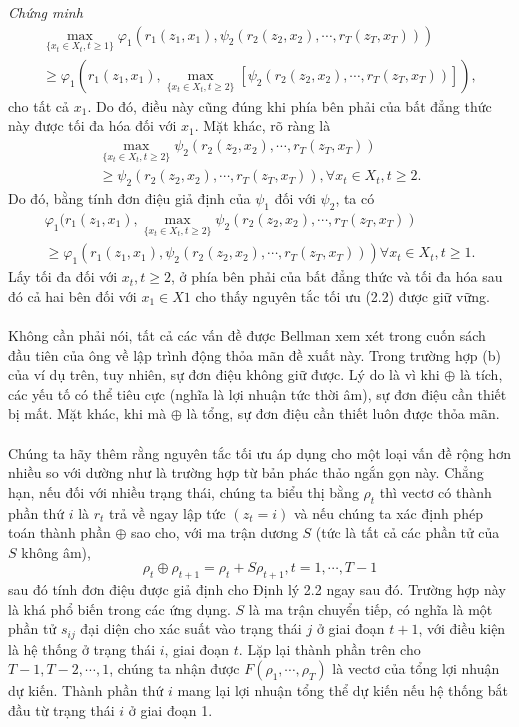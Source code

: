 \documentclass[12pt,a4paper]{report}
\begin{document}
		\textit{Chứng minh}
		\begin{eqnarray}
		\max_{\{x_t \in X_t, t \geq 1\}} \varphi_1(r_1(z_1, x_1), \psi_2(r_2(z_2,x_2),\cdots, r_T(z_T, x_T))) \nonumber \\  \geq \varphi_1(r_1(z_1, x_1), \max_{\{x_t \in X_t, t \geq 2\}}[\psi_2(r_2(z_2, x_2), \cdots, r_T(z_T, x_T))]), \nonumber
		\end{eqnarray}  
		cho tất cả $x_1$. Do đó, điều này cũng đúng khi phía bên phải của bất đẳng thức này được tối đa hóa đối với $x_1$. Mặt khác, rõ ràng là
			\begin{eqnarray}
		\max_{\{x_t \in X_t, t \geq 2\}}\psi_2(r_2(z_2,x_2),\cdots, r_T(z_T, x_T)) \nonumber \\  \geq \psi_2(r_2(z_2, x_2), \cdots, r_T(z_T, x_T)), \forall x_t \in X_t, t \geq 2. \nonumber
		\end{eqnarray} Do đó, bằng tính đơn điệu giả định của $\psi_1$ đối với $\psi_2$, ta có 	\begin{eqnarray}
 		\varphi_1(r_1(z_1, x_1), \max_{\{x_t \in X_t, t \geq 2\}}\psi_2(r_2(z_2, x_2), \cdots, r_T(z_T, x_T)) \nonumber\\ \geq \varphi_1(r_1(z_1,x_1), \psi_2(r_2(z_2,x_2), \cdots, r_T(z_T, x_T)))  \forall x_t \in X_t, t \geq 1. \nonumber
		\end{eqnarray} Lấy tối đa đối với $x_t, t \geq 2$, ở phía bên phải của bất đẳng thức và tối đa hóa sau đó cả hai bên đối với $x_1 \in X1$ cho thấy nguyên tắc tối ưu (2.2) được giữ vững. 
		\\\\Không cần phải nói, tất cả các vấn đề được Bellman xem xét trong cuốn sách đầu tiên của ông về lập trình động thỏa mãn đề xuất này. Trong trường hợp (b) của ví dụ trên,	
		tuy nhiên, sự đơn điệu không giữ được. Lý do là vì khi  $\oplus$ là tích, các yếu tố có thể tiêu cực (nghĩa là lợi nhuận tức thời âm), sự đơn điệu cần thiết bị mất. Mặt khác, khi mà $\oplus$ là tổng, 
		sự đơn điệu cần thiết luôn được thỏa mãn.\\\\ Chúng ta hãy thêm rằng nguyên tắc tối ưu áp dụng cho một loại vấn đề rộng hơn nhiều so với dường như là trường hợp từ bản phác thảo ngắn gọn này. Chẳng hạn, nếu đối với nhiều trạng thái, chúng ta biểu thị bằng $\rho_t$ thì vectơ có thành phần thứ $i$ là $r_t$ trả về ngay lập tức $(z_t = i)$ và nếu chúng ta xác định phép toán thành phần $\oplus$ sao cho, với ma trận dương $S$ (tức là tất cả các phần tử của $S$ không âm), $$\rho_t \oplus \rho_{t+1} = \rho_t + S\rho_{t+1}, t = 1, \cdots, T-1$$ sau đó tính đơn điệu được giả định cho Định lý 2.2 ngay sau đó. Trường hợp này là khá phổ biến trong các ứng dụng. $S$ là ma trận chuyển tiếp, có nghĩa là một phần tử $s_{ij}$ đại diện cho xác suất vào trạng thái $j$ ở giai đoạn $t + 1$, với điều kiện là hệ thống ở trạng thái $i$, giai đoạn $t$. Lặp lại thành phần trên cho $T-1, T-2, \cdots, 1$, chúng ta nhận được $F(\rho_1, \cdots, \rho_T)$ là vectơ của tổng lợi nhuận dự kiến. Thành phần thứ $i$ mang lại lợi nhuận tổng thể dự kiến nếu hệ thống bắt đầu từ trạng thái $i$ ở giai đoạn 1. 
\end{document}
